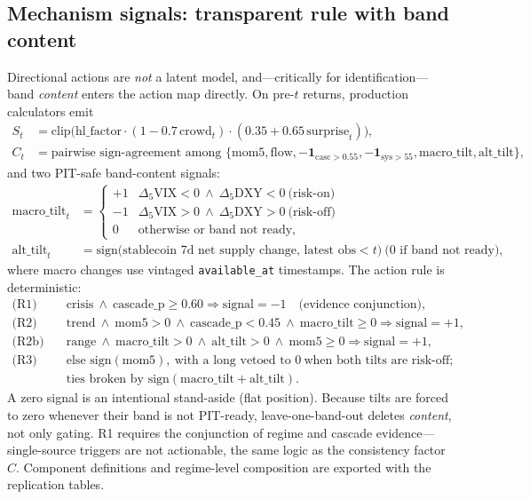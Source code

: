 \documentclass[12pt]{article}
\begin{document}
\subsection{Mechanism signals: transparent rule with band content}
\label{sec:mech}
Directional actions are \emph{not} a latent model, and---critically for identification---band \emph{content} enters the action map directly. On pre-$t$ returns, production calculators emit
\begin{align*}
S_t&=\mathrm{clip}\!\big(\mathrm{hl\_factor}\cdot(1-0.7\,\mathrm{crowd}_t)\cdot(0.35+0.65\,\mathrm{surprise}_t)\big),\\
C_t&=\text{pairwise sign-agreement among }\{\mathrm{mom5},\mathrm{flow},-\mathbf{1}_{\mathrm{casc}>0.55},-\mathbf{1}_{\mathrm{sys}>55},\mathrm{macro\_tilt},\mathrm{alt\_tilt}\},
\end{align*}
and two PIT-safe band-content signals:
\begin{align*}
\mathrm{macro\_tilt}_t&=\begin{cases}+1 & \Delta_5\mathrm{VIX}<0\ \wedge\ \Delta_5\mathrm{DXY}<0\ \text{(risk-on)}\\ -1 & \Delta_5\mathrm{VIX}>0\ \wedge\ \Delta_5\mathrm{DXY}>0\ \text{(risk-off)}\\ 0 & \text{otherwise or band not ready,}\end{cases}\\
\mathrm{alt\_tilt}_t&=\mathrm{sign}\bigl(\text{stablecoin 7d net supply change, latest obs}<t\bigr)\ \text{(0 if band not ready)},
\end{align*}
where macro changes use vintaged \texttt{available\_at} timestamps. The action rule is deterministic:
\begin{align*}
\text{(R1)}&\quad \mathrm{crisis}\ \wedge\ \mathrm{cascade\_p}\ge 0.60 \Rightarrow \mathrm{signal}=-1\quad\text{(evidence conjunction)},\\
\text{(R2)}&\quad \mathrm{trend}\ \wedge\ \mathrm{mom5}>0\ \wedge\ \mathrm{cascade\_p}<0.45\ \wedge\ \mathrm{macro\_tilt}\ge 0 \Rightarrow \mathrm{signal}=+1,\\
\text{(R2b)}&\quad \mathrm{range}\ \wedge\ \mathrm{macro\_tilt}>0\ \wedge\ \mathrm{alt\_tilt}>0\ \wedge\ \mathrm{mom5}\ge 0 \Rightarrow \mathrm{signal}=+1,\\
\text{(R3)}&\quad \text{else }\mathrm{sign}(\mathrm{mom5}),\ \text{with a long vetoed to }0\ \text{when both tilts are risk-off};\\
&\quad \text{ties broken by }\mathrm{sign}(\mathrm{macro\_tilt}+\mathrm{alt\_tilt}).
\end{align*}
A zero signal is an intentional stand-aside (flat position). Because tilts are forced to zero whenever their band is not PIT-ready, leave-one-band-out deletes \emph{content}, not only gating. R1 requires the conjunction of regime and cascade evidence---single-source triggers are not actionable, the same logic as the consistency factor $C$. Component definitions and regime-level composition are exported with the replication tables.
\end{document}
